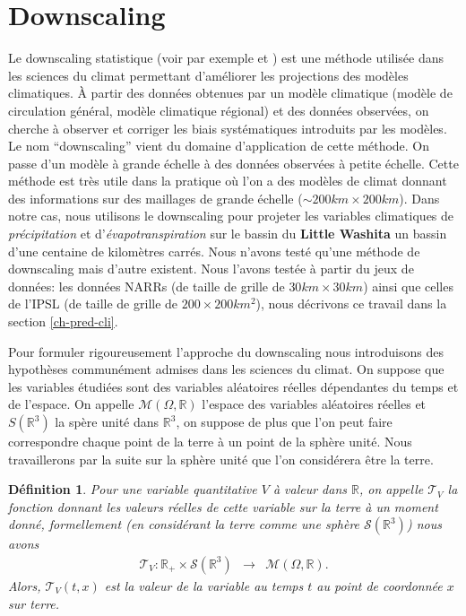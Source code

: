 \documentclass[a4paper,11pt]{article}
\newtheorem{definition}{Définition}
\begin{document}
\section{Downscaling}
\label{dwnsc}
Le downscaling statistique (voir par exemple \cite{vrac2012dynamical} et \cite{ayar2016intercomparison}) est une méthode utilisée dans les sciences du climat permettant d'améliorer les projections des modèles climatiques. À partir des données obtenues par un modèle climatique (modèle de circulation général, modèle climatique régional) et des données observées, on cherche à observer et corriger les biais systématiques introduits par les modèles. Le nom ``downscaling'' vient du domaine d'application de cette méthode. On passe d'un modèle à grande échelle à des données observées à petite échelle. Cette méthode est très utile dans la pratique où l'on a des modèles de climat donnant des informations sur des maillages de grande échelle ($\sim 200km\times 200km$). Dans notre cas, nous utilisons le downscaling pour projeter les variables climatiques de \textit{précipitation} et d'\textit{évapotranspiration} sur le bassin du \textbf{Little Washita} un bassin d'une centaine de kilomètres carrés. Nous n'avons testé qu'une méthode de downscaling mais d'autre existent. Nous l'avons testée à partir du jeux de données: les données NARRs (de taille de grille de $30km\times 30 km$) ainsi que celles de l'IPSL (de taille de grille de $200\times200 km^2$), nous décrivons ce travail dans la section \ref{ch-pred-cli}.

Pour formuler rigoureusement l'approche du downscaling nous introduisons des hypothèses communément admises dans les sciences du climat. On suppose que les variables étudiées sont des variables aléatoires réelles dépendantes du temps et de l'espace. On appelle $\mathcal{M}(\Omega,\mathbb{R})$ l'espace des variables aléatoires réelles et $S(\mathbb{R}^3)$ la spère unité dans $\mathbb{R}^3$, on suppose de plus que l'on peut faire correspondre chaque point de la terre à un point de la sphère unité. Nous travaillerons par la suite sur la sphère unité que l'on considérera être la terre.

\begin{definition}
	\label{terre}
	Pour une variable quantitative $V$ à valeur dans $\mathbb{R}$, on appelle $\mathcal{T}_V$ la fonction donnant les  valeurs réelles de cette variable sur la terre à un moment donné, formellement (en considérant la terre comme une sphère $\mathcal{S}(\mathbb{R}^3)$) nous avons
	\begin{equation}
		\begin{array}{ccc}
			\mathcal{T}_V: \mathbb{R}_{+}\times\mathcal{S}(\mathbb{R}^{3}) & \to & \mathcal{M}(\Omega,\mathbb{R}).
		\end{array}
	\end{equation}
	Alors, $\mathcal{T}_V(t,x)$ est la valeur de la variable au temps $t$ au point de coordonnée $x$ sur terre.	
\end{definition}
\end{document}
